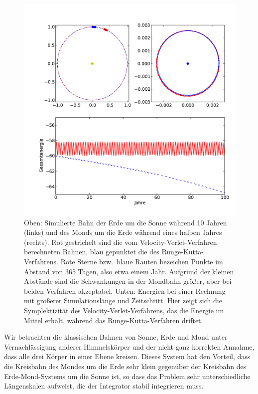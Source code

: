 \begin{figure}
  \centering
  \includegraphics[width=\textwidth]{plots/planets}
  \caption{Oben: Simulierte Bahn der Erde um die Sonne während 10
    Jahren (links) und des Monds um die Erde während eines halben
    Jahres (rechts). Rot gestrichelt sind die vom
    Velocity-Verlet-Verfahren berechneten Bahnen, blau gepunktet die
    des Runge-Kutta-Verfahrens. Rote Sterne bzw.\ blaue Rauten
    bezeichen Punkte im Abstand von 365 Tagen, also etwa einem
    Jahr. Aufgrund der kleinen Abstände sind die Schwankungen in der
    Mondbahn größer, aber bei beiden Verfahren akzeptabel. Unten:
    Energien bei einer Rechnung mit größerer Simulationslänge und
    Zeitschritt. Hier zeigt sich die Symplektizität des
    Velocity-Verlet-Verfahrens, das die Energie im Mittel erhält,
    während das Runge-Kutta-Verfahren driftet.}
  \label{fig:planets}
\end{figure}

Wir betrachten die klassischen Bahnen von Sonne, Erde und Mond unter
Vernachlässigung anderer Himmelskörper und der nicht ganz korrekten
Annahme, dass alle drei Körper in einer Ebene kreisen. Dieses System
hat den Vorteil, dass die Kreisbahn des Mondes um die Erde sehr klein
gegenüber der Kreisbahn des Erde-Mond-Systems um die Sonne ist, so
dass das Problem sehr unterschiedliche Längenskalen aufweist, die der
Integrator stabil integrieren muss.


